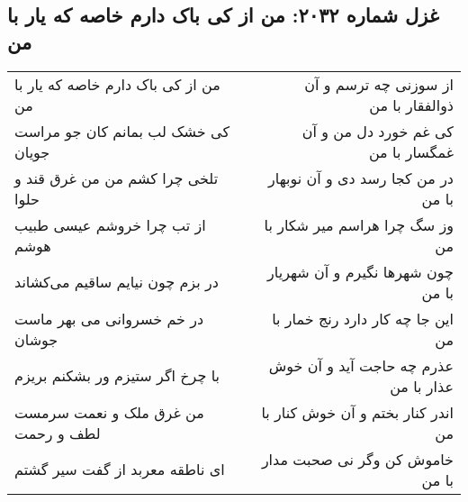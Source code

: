 \begin{center}
\section*{غزل شماره ۲۰۳۲: من از کی باک دارم خاصه که یار با من}
\label{sec:2032}
\begin{longtable}{l p{0.5cm} r}
من از کی باک دارم خاصه که یار با من
&&
از سوزنی چه ترسم و آن ذوالفقار با من
\\
کی خشک لب بمانم کان جو مراست جویان
&&
کی غم خورد دل من و آن غمگسار با من
\\
تلخی چرا کشم من من غرق قند و حلوا
&&
در من کجا رسد دی و آن نوبهار با من
\\
از تب چرا خروشم عیسی طبیب هوشم
&&
وز سگ چرا هراسم میر شکار با من
\\
در بزم چون نیایم ساقیم می‌کشاند
&&
چون شهرها نگیرم و آن شهریار با من
\\
در خم خسروانی می بهر ماست جوشان
&&
این جا چه کار دارد رنج خمار با من
\\
با چرخ اگر ستیزم ور بشکنم بریزم
&&
عذرم چه حاجت آید و آن خوش عذار با من
\\
من غرق ملک و نعمت سرمست لطف و رحمت
&&
اندر کنار بختم و آن خوش کنار با من
\\
ای ناطقه معربد از گفت سیر گشتم
&&
خاموش کن وگر نی صحبت مدار با من
\\
\end{longtable}
\end{center}
